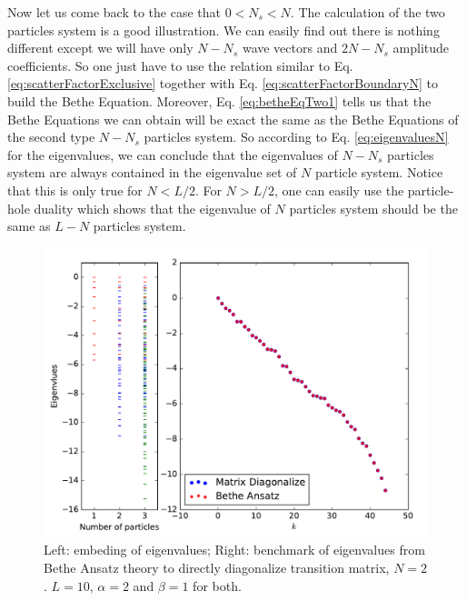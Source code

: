 \documentclass[12pt,a4paper]{article}
\begin{document}
Now let us come back to the case that $0<N_s<N$. The calculation of the two
particles system is a good illustration. We can easily find out there is
nothing different except we will have only $N-N_s$ wave vectors and $2N-N_s$
amplitude coefficients. So one just have to use the relation similar to Eq.
\eqref{eq:scatterFactorExclusive} together with Eq.
\eqref{eq:scatterFactorBoundaryN} to build the Bethe Equation. Moreover, Eq.
\eqref{eq:betheEqTwo1} tells us that the Bethe Equations we can obtain will be
exact the same as the Bethe Equations of the second type $N-N_s$ particles
system. So according to Eq. \eqref{eq:eigenvaluesN} for the eigenvalues, we can
conclude that the eigenvalues of $N-N_s$ particles system are always contained
in the eigenvalue set of $N$ particle system. Notice that this is only true for
$N<L/2$. For $N>L/2$, one can easily use the particle-hole duality which shows
that the eigenvalue of $N$ particles system should be the same as $L-N$
particles system.
\begin{figure}[htpb]
    \centering
    \includegraphics[width=0.8\linewidth]{spectrum}
    \caption{Left: embeding of eigenvalues; Right: benchmark of eigenvalues from
        Bethe Ansatz theory to directly diagonalize transition matrix, $N=2$.
        $L=10$, $\alpha=2$ and $\beta=1$ for both. }
    \label{fig:spectrum}
\end{figure}
\end{document}
